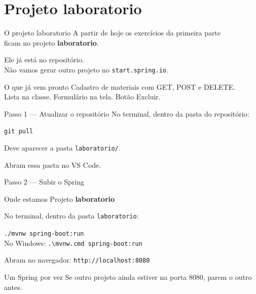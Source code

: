 \documentclass[aspectratio=169,11pt]{beamer}
\newcommand{\onde}[1]{%
  \begin{block}{Onde estamos}
    #1
  \end{block}
}
\begin{document}
\section{Projeto laboratorio}

\begin{frame}{O projeto laboratorio}
  A partir de hoje os exercícios da primeira parte\\
  ficam no projeto \textbf{laboratorio}.

  \vspace{0.5em}
  Ele já está no repositório.\\
  Não vamos gerar outro projeto no \texttt{start.spring.io}.

  \vspace{0.6em}
  \begin{block}{O que já vem pronto}
    Cadastro de materiais com GET, POST e DELETE.\\
    Lista na classe. Formulário na tela. Botão Excluir.
  \end{block}
\end{frame}

\begin{frame}{Passo 1 --- Atualizar o repositório}
  No terminal, dentro da pasta do repositório:

  \vspace{0.5em}
  \texttt{git pull}

  \vspace{0.6em}
  Deve aparecer a pasta \texttt{laboratorio/}.

  \vspace{0.5em}
  Abram essa pasta no VS Code.
\end{frame}

\begin{frame}{Passo 2 --- Subir o Spring}
  \onde{Projeto \textbf{laboratorio}}

  No terminal, dentro da pasta \texttt{laboratorio}:

  \vspace{0.4em}
  \texttt{./mvnw spring-boot:run}\\
  {\small No Windows: \texttt{.\textbackslash mvnw.cmd spring-boot:run}}

  \vspace{0.5em}
  Abram no navegador: \texttt{http://localhost:8080}

  \vspace{0.5em}
  \begin{alertblock}{Um Spring por vez}
    Se outro projeto ainda estiver na porta 8080,
    parem o outro antes.
  \end{alertblock}
\end{frame}
\end{document}
